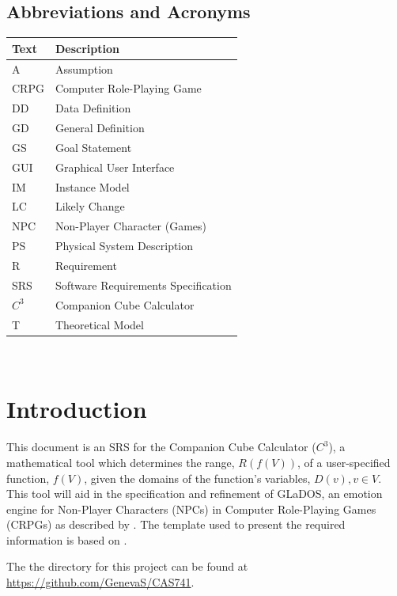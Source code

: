\documentclass[12pt]{article}
\newcommand{\progname}{Companion Cube Calculator} %
\newcommand{\prognameAbbrv}{$C^{3}$}
\begin{document}
\subsection{Abbreviations and Acronyms}

\renewcommand{\arraystretch}{1.2}
\begin{tabular}{l l} 
  \toprule		
  \textbf{Text} & \textbf{Description}\\
  \midrule 
  A & Assumption\\
  CRPG & Computer Role-Playing Game\\
  DD & Data Definition\\
  GD & General Definition\\
  GS & Goal Statement\\
  GUI & Graphical User Interface\\
  IM & Instance Model\\
  LC & Likely Change\\
  NPC & Non-Player Character (Games)\\
  PS & Physical System Description\\
  R & Requirement\\
  SRS & Software Requirements Specification\\
  \prognameAbbrv{} & \progname{}\\
  T & Theoretical Model\\
  \bottomrule
\end{tabular}

\newpage

\tableofcontents

~\newpage


\section{Introduction}
\label{intro}
This document is an SRS for the \progname{} (\prognameAbbrv{}), a mathematical 
tool which determines the range, $R(f(V))$, of a user-specified function, 
$f(V)$, given the domains of the function's variables, $D(v), v \in V$. This 
tool will aid in the specification and refinement of GLaDOS, an emotion engine 
for Non-Player Characters (NPCs) in Computer Role-Playing Games (CRPGs) as 
described by \citet{glados}. The template used to present the required 
information is based on \citet{SmithAndLai2005, SmithEtAl2007}.

The the directory for this project can be found at 
\href{https://github.com/GenevaS/CAS741}{https://github.com/GenevaS/CAS741}.
\end{document}
